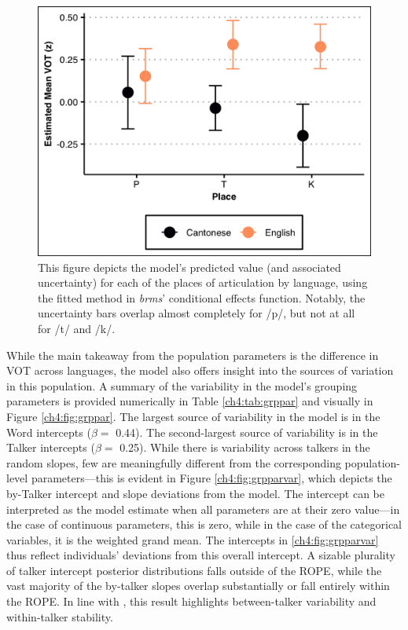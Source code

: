 \begin{figure}[htbp]
  \begin{center}
  \includegraphics[width=0.8\linewidth]{figures/ch4_conditionaleffects_4in.png} 
  \caption{This figure depicts the model's predicted value (and associated uncertainty) for each of the places of articulation by language, using the fitted method in \textit{brms}' conditional effects function. Notably, the uncertainty bars overlap almost completely for /p/, but not at all for /t/ and /k/.}
  \label{ch4:fig:conditionaleffects}
  \end{center}
\end{figure}

While the main takeaway from the population parameters is the difference in VOT across languages, the model also offers insight into the sources of variation in this population. A summary of the variability in the model's grouping parameters is provided numerically in Table \ref{ch4:tab:grppar} and visually in Figure \ref{ch4:fig:grppar}. The largest source of variability in the model is in the Word intercepts ($\beta=$ 0.44). The second-largest source of variability is in the Talker intercepts ($\beta=$ 0.25). While there is variability across talkers in the random slopes, few are meaningfully different from the corresponding population-level parameters---this is evident in Figure \ref{ch4:fig:grpparvar}, which depicts the by-Talker intercept and slope deviations from the model. The intercept can be interpreted as the model estimate when all parameters are at their zero value---in the case of continuous parameters, this is zero, while in the case of the categorical variables, it is the weighted grand mean. The intercepts in \ref{ch4:fig:grpparvar} thus reflect individuals' deviations from this overall intercept. A sizable plurality of talker intercept posterior distributions falls outside of the ROPE, while the vast majority of the by-talker slopes overlap substantially or fall entirely within the ROPE. In line with \citet{chodroff_2017_structure}, this result highlights between-talker variability and within-talker stability. 

